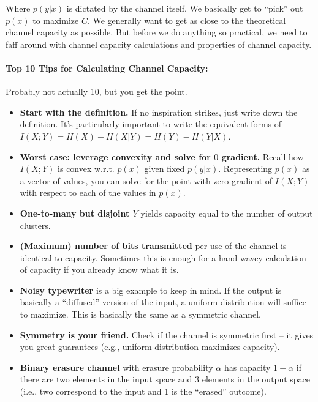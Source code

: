 \documentclass[a4paper,12pt]{report}
\begin{document}
Where $p(y | x)$ is dictated by the channel itself. We basically get to ``pick''
out $p(x)$ to maximize $C$. We generally want to get as close to the theoretical
channel capacity as possible. But before we do anything so practical, we need to
faff around with channel capacity calculations and properties of channel
capacity.

\paragraph{Top 10 Tips for Calculating Channel Capacity: } Probably not actually
10, but you get the point.
\begin{itemize}
\item \textbf{Start with the definition.} If no inspiration strikes, just write
down the definition. It's particularly important to write the equivalent forms
of $I(X; Y) = H(X) - H(X|Y) = H(Y) - H(Y|X)$. 
\item \textbf{Worst case: leverage convexity and solve for $0$ gradient.} Recall
how $I(X; Y)$ is convex w.r.t. $p(x)$ given fixed $p(y|x)$. Representing $p(x)$
as a vector of values, you can solve for the point with zero gradient of $I(X;
Y)$ with respect to each of the values in $p(x)$.
\item \textbf{One-to-many but disjoint $Y$} yields capacity equal to the number
of output clusters. 
\item \textbf{(Maximum) number of bits transmitted} per use of the channel is
identical to capacity. Sometimes this is enough for a hand-wavey calculation of
capacity if you already know what it is. 
\item \textbf{Noisy typewriter} is a big example to keep in mind. If the output
is basically a ``diffused'' version of the input, a uniform distribution will
suffice to maximize. This is basically the same as a symmetric channel.
\item \textbf{Symmetry is your friend.} Check if the channel is symmetric first
-- it gives you great guarantees (e.g., uniform distribution maximizes
capacity).
\item \textbf{Binary erasure channel} with erasure probability $\alpha$ has
capacity $1-\alpha$ if there are two elements in the input space and 3 elements
in the output space (i.e., two correspond to the input and 1 is the ``erased''
outcome).
\end{itemize}
\end{document}
